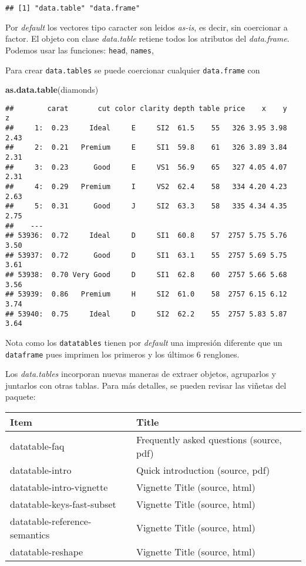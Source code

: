 \documentclass[]{article}
\newenvironment{Shaded}{\begin{snugshade}}{\end{snugshade}}
\newcommand{\KeywordTok}[1]{\textcolor[rgb]{0.13,0.29,0.53}{\textbf{#1}}}
\newcommand{\NormalTok}[1]{#1}
\begin{document}
\begin{verbatim}
## [1] "data.table" "data.frame"
\end{verbatim}

Por \emph{default} los vectores tipo caracter son leidos \emph{as-is},
es decir, sin coercionar a factor. El objeto con clase \emph{data.table}
retiene todos los atributos del \emph{data.frame}. Podemos usar las
funciones: \texttt{head}, \texttt{names},

Para crear \texttt{data.tables} se puede coercionar cualquier
\texttt{data.frame} con

\begin{Shaded}
\begin{Highlighting}[]
\KeywordTok{as.data.table}\NormalTok{(diamonds)}
\end{Highlighting}
\end{Shaded}

\begin{verbatim}
##        carat       cut color clarity depth table price    x    y    z
##     1:  0.23     Ideal     E     SI2  61.5    55   326 3.95 3.98 2.43
##     2:  0.21   Premium     E     SI1  59.8    61   326 3.89 3.84 2.31
##     3:  0.23      Good     E     VS1  56.9    65   327 4.05 4.07 2.31
##     4:  0.29   Premium     I     VS2  62.4    58   334 4.20 4.23 2.63
##     5:  0.31      Good     J     SI2  63.3    58   335 4.34 4.35 2.75
##    ---                                                               
## 53936:  0.72     Ideal     D     SI1  60.8    57  2757 5.75 5.76 3.50
## 53937:  0.72      Good     D     SI1  63.1    55  2757 5.69 5.75 3.61
## 53938:  0.70 Very Good     D     SI1  62.8    60  2757 5.66 5.68 3.56
## 53939:  0.86   Premium     H     SI2  61.0    58  2757 6.15 6.12 3.74
## 53940:  0.75     Ideal     D     SI2  62.2    55  2757 5.83 5.87 3.64
\end{verbatim}

Nota como los \texttt{datatables} tienen por \emph{default} una
impresión diferente que un \texttt{dataframe} pues imprimen los primeros
y los últimos 6 renglones.

Los \emph{data.tables} incorporan nuevas maneras de extraer objetos,
agruparlos y juntarlos con otras tablas. Para más detalles, se pueden
revisar las viñetas del paquete:

\begin{longtable}[]{@{}ll@{}}
\toprule
Item & Title\tabularnewline
\midrule
\endhead
datatable-faq & Frequently asked questions (source, pdf)\tabularnewline
datatable-intro & Quick introduction (source, pdf)\tabularnewline
datatable-intro-vignette & Vignette Title (source, html)\tabularnewline
datatable-keys-fast-subset & Vignette Title (source,
html)\tabularnewline
datatable-reference-semantics & Vignette Title (source,
html)\tabularnewline
datatable-reshape & Vignette Title (source, html)\tabularnewline
\bottomrule
\end{longtable}
\end{document}
